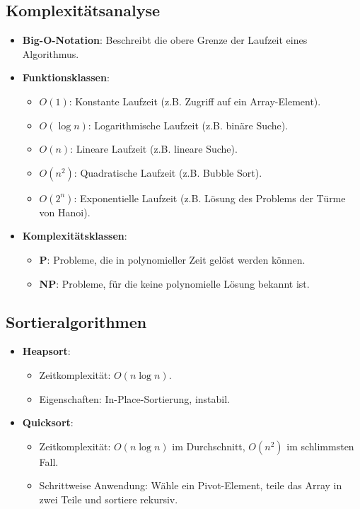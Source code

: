 \documentclass[a4paper,12pt]{article}
\begin{document}
\subsection{Komplexitätsanalyse}
\begin{itemize}
    \item \textbf{Big-O-Notation}: Beschreibt die obere Grenze der Laufzeit eines Algorithmus.
    \item \textbf{Funktionsklassen}:
    \begin{itemize}
        \item \( O(1) \): Konstante Laufzeit (z.B. Zugriff auf ein Array-Element).
        \item \( O(\log n) \): Logarithmische Laufzeit (z.B. binäre Suche).
        \item \( O(n) \): Lineare Laufzeit (z.B. lineare Suche).
        \item \( O(n^2) \): Quadratische Laufzeit (z.B. Bubble Sort).
        \item \( O(2^n) \): Exponentielle Laufzeit (z.B. Lösung des Problems der Türme von Hanoi).
    \end{itemize}
    \item \textbf{Komplexitätsklassen}:
    \begin{itemize}
        \item \textbf{P}: Probleme, die in polynomieller Zeit gelöst werden können.
        \item \textbf{NP}: Probleme, für die keine polynomielle Lösung bekannt ist.
    \end{itemize}
\end{itemize}

\vspace{1em} 

\subsection{Sortieralgorithmen}
\begin{itemize}
    \item \textbf{Heapsort}:
    \begin{itemize}
        \item Zeitkomplexität: \( O(n \log n) \).
        \item Eigenschaften: In-Place-Sortierung, instabil.
    \end{itemize}
    \item \textbf{Quicksort}:
    \begin{itemize}
        \item Zeitkomplexität: \( O(n \log n) \) im Durchschnitt, \( O(n^2) \) im schlimmsten Fall.
        \item Schrittweise Anwendung: Wähle ein Pivot-Element, teile das Array in zwei Teile und sortiere rekursiv.
    \end{itemize}
\end{itemize}
\end{document}
